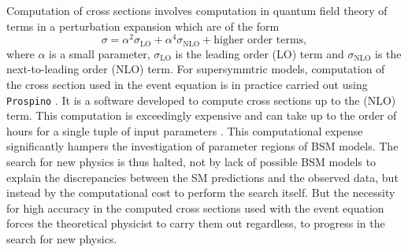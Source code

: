 Computation of cross sections involves computation in quantum field theory of terms in a perturbation expansion which are of the form 
\begin{equation}
    \sigma = \alpha^2\sigma_{\text{LO}} +  \alpha^4 \sigma_{\text{NLO}} + \text{higher order terms},
\end{equation}
where $\alpha$ is a small parameter, $\sigma_{\text{LO}}$ is the leading order (LO) term and $\sigma_{\text{NLO}}$ is the next-to-leading order (NLO) term.
For supersymmtric models, computation of the cross section used in the event equation is in practice carried out using {\tt Prospino} \cite{prospino}. It is a software developed to compute cross sections up to the (NLO) term. This computation is exceedingly expensive and can take up to the order of hours for a single tuple of input parameters \cite{xsec}. This computational expense significantly hampers the investigation of parameter regions of BSM models. The search for new physics is thus halted, not by lack of possible BSM models to explain the discrepancies between the SM predictions and the observed data, but instead by the computational cost to perform the search itself. But the necessity for high accuracy in the computed cross sections used with the event equation forces the theoretical physicist to carry them out regardless, to progress in the search for new physics.

\begin{comment}
\begin{itemize}
    \item $n_i$: Målte events (kollisjoner) som oppfyller et sett (kalt signalregion) med kriterier (``cuts'').
    \item $b_i$: Bakgrunnen. Estimert SM bidrag for samme signal region.
    \item $s_i$: BSM estimert bidrag for signalregionen med et sett med parameterverdier for en ny BSM modell (i.e SUSY). Den er regnet ut ved 
    \begin{equation}
        s_i = \sigma \epsilon_i A_i \mathcal{L},
    \end{equation}
    der $\sigma$ er tverrsnittet som måler sannsynligheten for at en ``ny'' prosess skjer, $\epsilon_i$ er detektor effektivitet, $A_i$ er akseptans 
    og $\mathcal{L}$ er integrert luminositet over data brukt i søket. 
    \item Statistisk analyse gjøres med å regne ut Poisson likelihood 
    \begin{equation}
        \mathcal{L}(s, b, n) = \frac{e^{-(s + b)}(s + b)^n}{n!}.
    \end{equation} 
    og en test statistikk
    \begin{equation}
        q = -2\ln \frac{\mathcal{L}(s, b, n)}{\mathcal{L}(s=0, b, n)}.
    \end{equation}
\end{itemize}
\end{comment}

